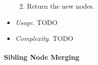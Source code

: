 \begin{itemize}
\begin{enumerate}
\begin{enumerate}
\end{enumerate}

\item Return the new nodes.

\end{enumerate}

\item \emph{Usage}. TODO

\item \emph{Complexity}. TODO

\end{itemize}


\paragraph{Sibling Node Merging}

